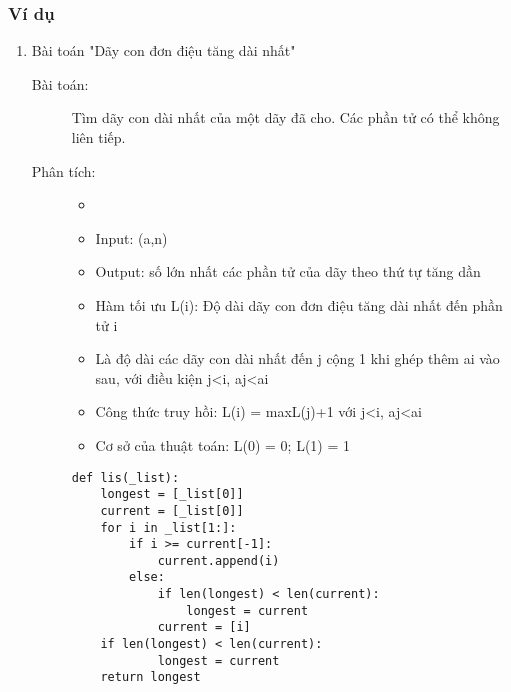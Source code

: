 \subsubsection{Ví dụ}
\begin{enumerate}
    \item Bài toán "Dãy con đơn điệu tăng dài nhất"
    \begin{description}
        \item[Bài toán:] Tìm dãy con dài nhất của một dãy đã cho. Các phần tử có thể không liên tiếp.
        \item[Phân tích:]
            \begin{itemize}
                \item[]
                \item Input: (a,n)
                \item Output: số lớn nhất các phần tử của dãy theo thứ tự tăng dần
                \item Hàm tối ưu L(i): Độ dài dãy con đơn điệu tăng dài nhất đến phần tử i
                \item[]Là độ dài các dãy con dài nhất đến j cộng 1 khi ghép thêm ai vào sau, với
                điều kiện j<i, aj<ai
                \item Công thức truy hồi: L(i) = max{L(j)}+1 với j<i, aj<ai
                \item Cơ sở của thuật toán: L(0) = 0; L(1) = 1
            \end{itemize}
            \begin{lstlisting}[style=algo]
def lis(_list):
    longest = [_list[0]]
    current = [_list[0]]
    for i in _list[1:]:
        if i >= current[-1]:
            current.append(i)
        else:
            if len(longest) < len(current):
                longest = current
            current = [i]
    if len(longest) < len(current):
            longest = current
    return longest
            \end{lstlisting}
    \end{description}



\end{enumerate}
